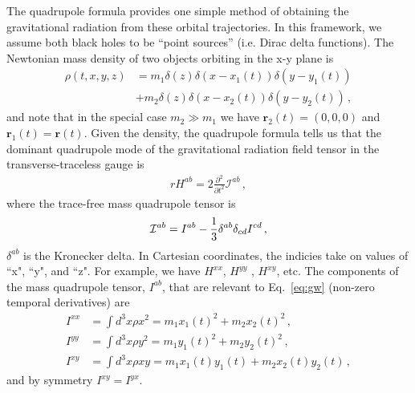 \documentclass[ reprint,
nofootinbib,
 amsmath,amssymb,
 aps,
]{revtex4-2}
\begin{document}
The quadrupole formula provides one simple method of obtaining the gravitational radiation from these orbital trajectories. 
In this framework, we assume 
both black holes to be ``point sources'' (i.e. Dirac delta functions). The Newtonian mass density of two objects orbiting in the x-y plane is 
\begin{align}
\rho(t,x,y,z) & = m_1 \delta(z) \delta(x - x_1(t) ) \delta(y - y_1(t) ) \nonumber \\
  & + m_2 \delta(z) \delta(x - x_2(t) ) \delta(y - y_2(t) ) \,,
\end{align}
and note that
in the special case $m_2 \gg m_1$ we have $\mathbf{r}_2(t) = (0,0,0)$ and
$\mathbf{r}_1(t) =  \mathbf{r}(t)$. Given the density, the quadrupole formula tells us
that the dominant quadrupole mode of the gravitational radiation field tensor
in the transverse-traceless gauge is 
\begin{align} \label{eq:gw}
r H^{ab} = 2 \frac{\partial^2}{\partial t^2} \mathcal{I}^{ab} \,,
\end{align}
where the trace-free mass quadrupole tensor is
\begin{align} \label{eq:gw_mathcalI}
{\cal I}^{ab} 
= I^{ab} - \frac{1}{3} \delta^{ab}\delta_{cd}I^{cd} \,,
\end{align}
$\delta^{ab}$ is the Kronecker delta. 
In Cartesian coordinates, the indicies take on values of ``x", ``y", and ``z".
For example, we have $H^{xx}$, $H^{yy}$ , $H^{xy}$, etc.
The components of the mass quadrupole tensor, $I^{ab}$, that are relevant to Eq.~\eqref{eq:gw} (non-zero temporal derivatives) are
\begin{subequations}
\label{eq:I}
\begin{align}
	I^{xx} & = \int d^3x \rho x^2 = m_1 x_1(t)^2 + m_2 x_2(t)^2  \,, \\	I^{yy} & = \int d^3x \rho y^2 = m_1 y_1(t)^2 + m_2 y_2(t)^2 \,, \\
	I^{xy} & = \int d^3x \rho xy = m_1 x_1(t)y_1(t) + m_2 x_2(t)y_2(t) \,,
\end{align}
\end{subequations}
and by symmetry $I^{xy} = I^{yx}$. 
\end{document}
